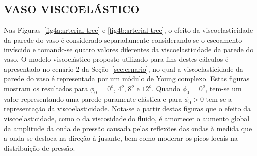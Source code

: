 \subsection{VASO VISCOELÁSTICO}\label{sec:cenario2}

Nas Figuras~\ref{fig4a:arterial-tree} e \ref{fig4b:arterial-tree}, o efeito da viscoelasticidade da parede do vaso é considerado separadamente considerando-se o escoamento invíscido e tomando-se quatro valores diferentes da viscoelasticidade da parede do vaso. O modelo viscoelástico proposto utilizado para fins destes cálculos é apresentado no cenário 2 da Seção~\ref{sec:cenario}, no qual a viscoelasticidade da parede do vaso é representada por um módulo de Young complexo. Estas figuras mostram os resultados para $\phi_0$ = $0^o$, $4^o$, $8^o$ e $12^o$. Quando $\phi_0$ = $0^o$, tem-se um valor representando uma parede puramente elástica e para $\phi_0> 0$ tem-se a representação da viscoelasticidade. Nota-se a partir destas figuras que o efeito da viscoelasticidade, como o da viscosidade do fluido, é amortecer o aumento global da amplitude da onda de pressão causada pelas reflexões das ondas à medida que a onda se desloca na direção à jusante, bem como moderar os picos locais na distribuição de pressão. 

